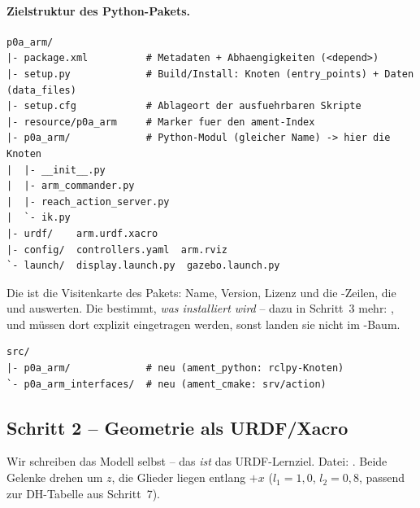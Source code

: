 \paragraph{Zielstruktur des Python-Pakets.}
\begin{lstlisting}[style=bash,caption={Verzeichnisbaum von \code{p0a\_arm} (Endstand Projekt 0.A)}]
p0a_arm/
|- package.xml          # Metadaten + Abhaengigkeiten (<depend>)
|- setup.py             # Build/Install: Knoten (entry_points) + Daten (data_files)
|- setup.cfg            # Ablageort der ausfuehrbaren Skripte
|- resource/p0a_arm     # Marker fuer den ament-Index
|- p0a_arm/             # Python-Modul (gleicher Name) -> hier die Knoten
|  |- __init__.py
|  |- arm_commander.py
|  |- reach_action_server.py
|  `- ik.py
|- urdf/    arm.urdf.xacro
|- config/  controllers.yaml  arm.rviz
`- launch/  display.launch.py  gazebo.launch.py
\end{lstlisting}
\noindent Die  ist die Visitenkarte des Pakets: Name, Version,
Lizenz und die -Zeilen, die  und 
auswerten. Die  bestimmt, \emph{was installiert wird} -- dazu in
Schritt~3 mehr: ,  und  müssen dort
explizit eingetragen werden, sonst landen sie nicht im -Baum.
\begin{lstlisting}[style=bash,caption={\code{ros2\_ws}-Delta nach Schritt 1 (\# neu / \# angepasst)}]
src/
|- p0a_arm/             # neu (ament_python: rclpy-Knoten)
`- p0a_arm_interfaces/  # neu (ament_cmake: srv/action)
\end{lstlisting}

\subsection{Schritt 2 -- Geometrie als URDF/Xacro}
Wir schreiben das Modell selbst -- das \emph{ist} das URDF-Lernziel. Datei:
. Beide Gelenke drehen um $z$, die Glieder
liegen entlang $+x$ ($l_1=1{,}0$, $l_2=0{,}8$, passend zur DH-Tabelle aus
Schritt~7).

